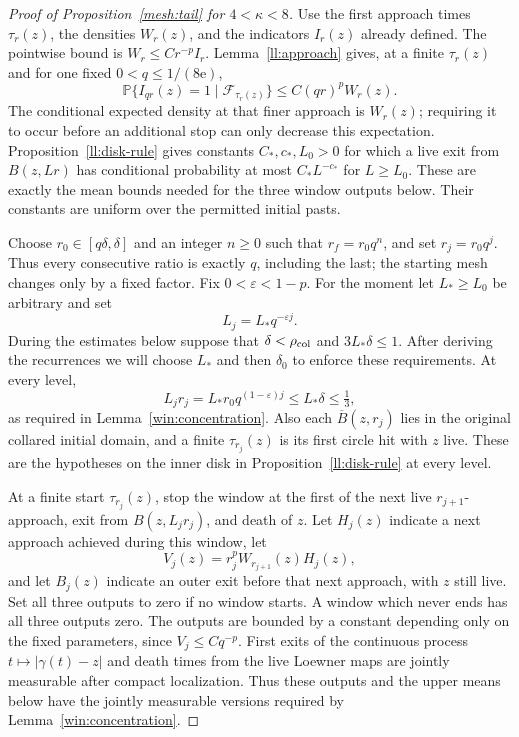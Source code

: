 \begin{proof}[Proof of Proposition~\ref{mesh:tail} for $4<\kappa<8$]
Use the first approach times $\tau_r(z)$, the densities $W_r(z)$,
and the indicators $I_r(z)$ already defined. The pointwise bound is
$W_r\le Cr^{-p}I_r$. Lemma~\ref{ll:approach} gives, at a finite
$\tau_r(z)$ and for one fixed $0<q\le1/(8\mathrm e)$,
\begin{equation}
 \mathbb P\{I_{qr}(z)=1\mid\mathcal F_{\tau_r(z)}\}
       \le C(qr)^pW_r(z).
 \label{win:onepoint-input}
\end{equation}
The conditional expected density at that finer approach is $W_r(z)$;
requiring it to occur before an additional stop can only decrease this
expectation. Proposition~\ref{ll:disk-rule} gives constants
$C_*,c_*,L_0>0$ for which a live exit from $B(z,Lr)$ has conditional
probability at most $C_*L^{-c_*}$ for $L\ge L_0$.
These are exactly the mean bounds needed for the three window outputs
below. Their constants are uniform over the permitted initial pasts.

Choose $r_0\in[q\delta,\delta]$ and an integer $n\ge0$ such that
$r_f=r_0q^n$, and set $r_j=r_0q^j$.  Thus every consecutive ratio is
exactly $q$, including the last; the starting mesh changes only by a
fixed factor.  Fix $0<\varepsilon<1-p$.  For the moment let
$L_*\ge L_0$ be arbitrary and set
\[
 L_j=L_*q^{-\varepsilon j}.
\]
During the estimates below suppose that $\delta<\rho_{\rm col}$ and
$3L_*\delta\le1$.  After deriving the recurrences we
will choose $L_*$ and then $\delta_0$ to enforce these requirements.
At every level,
\[
 L_jr_j=L_*r_0q^{(1-\varepsilon)j}\le L_*\delta\le\tfrac13,
\]
as required in Lemma~\ref{win:concentration}.  Also each
$\overline B(z,r_j)$ lies in the original collared initial domain, and a finite
$\tau_{r_j}(z)$ is its first circle hit with $z$ live.  These are the
hypotheses on the inner disk in Proposition~\ref{ll:disk-rule} at every level.

At a finite start $\tau_{r_j}(z)$, stop the window at the first of
the next live $r_{j+1}$-approach, exit from $B(z,L_jr_j)$, and death
of $z$.  Let $H_j(z)$ indicate a next approach achieved during this
window, let
\[
 V_j(z)=r_j^pW_{r_{j+1}}(z)H_j(z),
\]
and let $B_j(z)$ indicate an outer exit before that next approach,
with $z$ still live.  Set all three outputs to zero if no window
starts.  A window which never ends has all three outputs zero.
The outputs are bounded by a constant depending only on the fixed
parameters, since $V_j\le Cq^{-p}$.
First exits of the continuous process $t\mapsto|\gamma(t)-z|$ and death times
from the live Loewner maps are jointly measurable after compact
localization.  Thus these outputs and the upper means below have the
jointly measurable versions required by Lemma~\ref{win:concentration}.


\end{proof}
